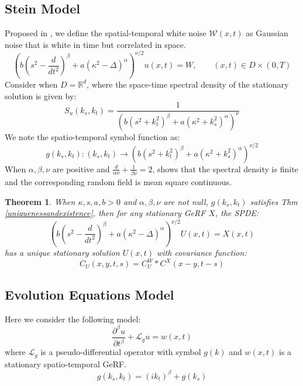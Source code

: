 \documentclass{article}
\newtheorem{theorem}{Theorem}
\begin{document}
\subsection{Stein Model}
Proposed in \cite{stein2005space}, we define the spatial-temporal white noise $\mathcal{W}(x,t)$ as Gaussian noise that is white in time but correlated in space.
\begin{equation}\label{SteinModel}
	\left(b(s^2-\frac{d}{dt^2})^\beta + a(\kappa^2-\Delta)^\alpha\right)^{\nu / 2}u(x,t) = W,\qquad (x, t)\in D\times (0, T)
\end{equation}
Consider when $D = \mathbb{R}^d$, where the space-time spectral density of the stationary solution is given by:
\begin{equation}
	S_u(k_s, k_t) = \frac{1}{(b(s^2 + k_t^2)^\beta + a(\kappa^2 + k_s^2)^\alpha)^\nu}
\end{equation}
We note the spatio-temporal symbol function as:
\begin{equation}
	g(k_s, k_t): (k_s, k_t)\rightarrow (b(s^2 + k_t^2)^\beta + a(\kappa^2 + k_s^2)^\alpha)^{\nu/2}
\end{equation}
When $\alpha, \beta, \nu$ are positive and $\frac{d}{\alpha\nu}+\frac{1}{\beta\nu} = 2$, 
\cite{stein2005space} shows that the spectral density is finite and the corresponding random field is mean square continuous.

\begin{theorem}
	When $\kappa, s, a, b>0$ and $\alpha, \beta, \nu$ are not null, $g(k_s, k_t)$ satisfies Thm \ref{uniquenessandexistence}, 
then for any stationary GeRF $X$, the SPDE:
\begin{equation}
	\left(b(s^2-\frac{d}{dt^2})^\beta + a(\kappa^2-\Delta)^\alpha\right)^{\nu / 2}U(x,t) = X(x,t)
\end{equation}
has a unique stationary solution $U(x,t)$ with covariance function:
\begin{equation}
	C_U(x, y, t, s) = C_U^W*C^X(x-y, t-s)
\end{equation}
\end{theorem}

\subsection{Evolution Equations Model}
Here we consider the following model:
\begin{equation}
	\frac{\partial^\beta u}{\partial t^\beta} + \mathcal{L}_gu = w(x,t)
\end{equation}
where $\mathcal{L}_g$ is a pseudo-differential operator with symbol $g(k)$ and $w(x,t)$ is a stationary spatio-temporal GeRF.
\begin{equation}
	g(k_s, k_t) = (ik_t)^\beta + g(k_s)
\end{equation}
\end{document}
